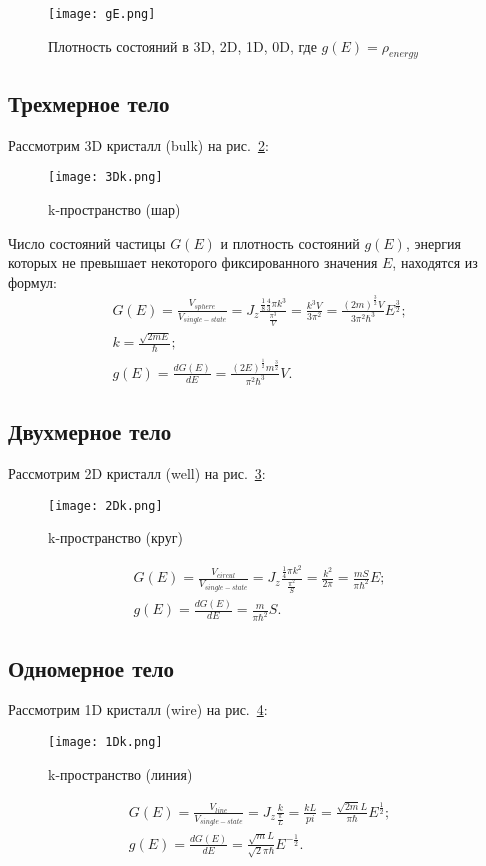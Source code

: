 \begin{figure}[h]
	\centering
	\texttt{[image: gE.png]}
	\caption{Плотность состояний в 3D, 2D, 1D, 0D, где $g(E) = \rho_{energy}$}
	\label{DOS}
\end{figure}

\subsection{Трехмерное тело}
Рассмотрим 3D кристалл (bulk) на рис.~\ref{fig:3Dk}:
\begin{figure}[h]
	\centering
	\texttt{[image: 3Dk.png]}
	\caption{k-пространство (шар)}
	\label{fig:3Dk}
\end{figure}

Число состояний частицы $G(E)$ и плотность состояний $g(E)$, энергия которых не превышает некоторого фиксированного значения $E$, находятся из формул:
\begin{gather*} 
	G(E) = \frac{V_{sphere}}{V_{single-state}} = J_{z}\frac{\frac{1}{8}\frac{4}{3}\pi k^{3}}{\frac{\pi^3}{V}} = \frac{k^{3}V}{3\pi^{2}} = \frac{(2m)^{\frac{3}{2}}V}{3\pi^{2}\hbar^{3}}E^{\frac{3}{2}};\\
	k = \frac{\sqrt{2mE}}{\hbar};\\
	g(E) = \frac{dG(E)}{dE} = \frac{(2E)^{\frac{1}{2}}m^{\frac{3}{2}}}{\pi^{2}\hbar^{3}}V.
\end{gather*}

\subsection{Двухмерное тело}
Рассмотрим 2D кристалл (well) на рис.~\ref{fig:2Dk}:
\begin{figure}[h]
	\centering
	\texttt{[image: 2Dk.png]}
	\caption{k-пространство (круг)}
	\label{fig:2Dk}
\end{figure}

\begin{gather*} 
	G(E) = \frac{V_{circul}}{V_{single-state}} = J_{z}\frac{\frac{1}{4}\pi k^{2}}{\frac{\pi^2}{S}} = \frac{k^{2}}{2\pi} = \frac{mS}{\pi\hbar^{2}}E;\\
	g(E) = \frac{dG(E)}{dE} = \frac{m}{\pi\hbar^{2}}S.
\end{gather*}

\subsection{Одномерное тело}
Рассмотрим 1D кристалл (wire)  на рис.~\ref{fig:1Dk}:
\begin{figure}[h]
	\centering
	\texttt{[image: 1Dk.png]}
	\caption{k-пространство (линия)}
	\label{fig:1Dk}
\end{figure}
\begin{gather*} 
	G(E) = \frac{V_{line}}{V_{single-state}} = J_{z}\frac{k}{\frac{\pi}{L}} = \frac{kL}{pi} = \frac{\sqrt{2m}L}{\pi\hbar}E^{\frac{1}{2}};\\
	g(E) = \frac{dG(E)}{dE} = \frac{\sqrt{m}L}{\sqrt{2}\pi\hbar}E^{-\frac{1}{2}}.
\end{gather*}

